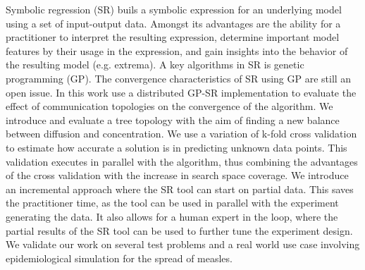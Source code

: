 Symbolic regression (SR) buils a symbolic expression for an underlying model using a set of input-output data.
Amongst its advantages are the ability for a practitioner to interpret the resulting expression, determine important model features by their usage in the expression, and gain insights into the behavior of the resulting model (e.g. extrema). A key algorithms in SR is genetic programming (GP). The convergence characteristics of SR using GP are still an open issue.
In this work use a distributed GP-SR implementation to evaluate the effect of communication topologies on the convergence of the algorithm.
We introduce and evaluate a tree topology with the aim of finding a new balance between diffusion and concentration.
We use a variation of k-fold cross validation to estimate how accurate a solution is in predicting unknown data points. This validation executes in parallel with the algorithm, thus combining the advantages of the cross validation with the increase in search space coverage. We introduce an incremental approach where the SR tool can start on partial data. This saves the practitioner time, as the tool can be used in parallel with the experiment generating the data. It also allows for a human expert in the loop, where the partial results of the SR tool can be used to further tune the experiment design. We validate our work on several test problems and a real world use case involving epidemiological simulation for the spread of measles.